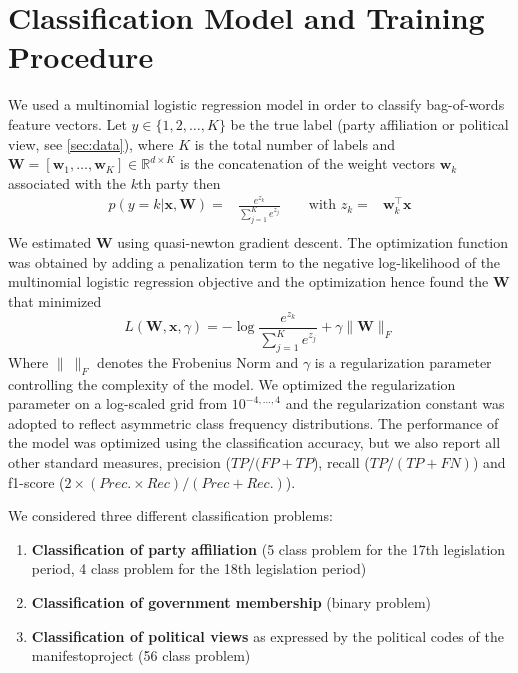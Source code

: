 \documentclass[runningheads,a4paper]{llncs}
\renewcommand{\vec}[1]{\mathbf{#1}}
\newcommand{\R}{\mathds{R}}
\begin{document}
\section{Classification Model and Training Procedure}\label{sec:model}
We used a multinomial logistic regression model in order to classify bag-of-words feature vectors. Let $y\in\{1,2,\dots,K\}$ be the true  label (party affiliation or political view, see \autoref{sec:data}), where $K$ is the total number of labels and $\vec{W}=[\vec{w}_1,\dots,\vec{w}_K]\in\R^{d\times K}$ is the concatenation of the weight vectors $\vec{w}_k$ associated with the $k$th party then 
\begin{eqnarray}\label{eq:logreg_multiclass}
p(y=k|\vec{x},\vec{W}) = &\frac{e^{z_k}}{\sum_{j=1}^K e^{z_j}} \qquad \textrm{with }  z_k=&\vec{w}_k^{\top}\vec{x} \\\nonumber
\end{eqnarray}
%
We estimated $\vec{W}$ using quasi-newton gradient descent. The optimization function was obtained by adding a penalization term to the negative log-likelihood of the multinomial logistic regression objective and the optimization hence found the $\vec{W}$ that minimized
\begin{equation}\label{eq:objective}
L(\vec{W}, \vec{x}, \gamma) = - \log{\frac{e^{z_k}}{\sum_{j=1}^K e^{z_j}}}+ \gamma \| \vec{W} \|_{F}
\end{equation}
Where $\|~\|_F$ denotes the Frobenius Norm and $\gamma$ is a regularization parameter controlling the complexity of the model. 
 We optimized the regularization parameter on a log-scaled grid from $10^{-4,\dots,4}$ and the regularization constant was adopted to reflect asymmetric class frequency distributions. The performance of the model was optimized using the classification accuracy, but we also report all other standard measures, precision ($TP / (FP + TP$), recall ($TP / (TP + FN)$) and f1-score ($2\times (Prec. \times Rec) / (Prec + Rec.)$). 

We considered three different classification problems: 
\begin{enumerate}
\item {\bf Classification of party affiliation} (5 class problem for the 17th legislation period, 4 class problem for the 18th legislation period)
\item {\bf Classification of government membership} (binary problem)
\item {\bf Classification of political views} as expressed by the political codes of the manifestoproject (56 class problem)
\end{enumerate}
\end{document}
